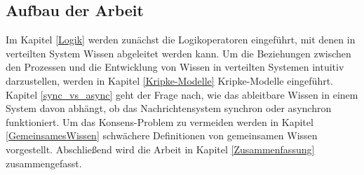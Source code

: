 \subsection{Aufbau der Arbeit}
Im Kapitel \ref{Logik} werden zunächst die Logikoperatoren eingeführt, mit denen in verteilten System Wissen abgeleitet werden kann.
Um die Beziehungen zwischen den Prozessen und die Entwicklung von Wissen in verteilten Systemen intuitiv darzustellen, werden in Kapitel \ref{Kripke-Modelle} Kripke-Modelle eingeführt. Kapitel \ref{sync_vs_async} geht der Frage nach, wie das ableitbare Wissen in einem System davon abhängt, ob das Nachrichtensystem synchron oder asynchron funktioniert. Um das Konsens-Problem zu vermeiden werden in Kapitel \ref{GemeinsamesWissen} schwächere Definitionen von gemeinsamen Wissen vorgestellt.
Abschließend wird die Arbeit in Kapitel \ref{Zusammenfassung} zusammengefasst.